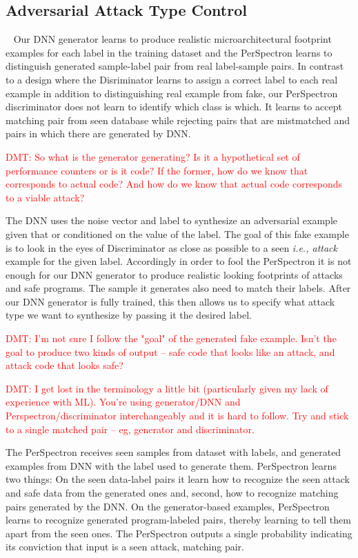 \subsection{Adversarial Attack Type Control}~\label{TypeControl}
 Our DNN generator learns to produce realistic microarchitectural footprint examples for each label in the training dataset and the PerSpectron learns to distinguish generated sample-label pair from real label-sample pairs.   
 In contrast to a design where the Disriminator learns to assign a correct label to each real example in addition to distinguishing real example from fake, our PerSpectron discriminator does not learn to identify which class is which.  It learns to accept matching pair from seen database while rejecting pairs that are mistmatched and pairs in which there are generated by DNN. 
 
 \textcolor{red}{DMT: So what is the generator generating?  Is it a hypothetical set of performance
 counters or is it code?  If the former, how do we know that corresponds to actual code?  And how do we know that actual code 
 corresponds to a viable attack?}
 
 The DNN uses the noise vector and label to synthesize an adversarial example given that or conditioned on the value of the label. The goal of this fake example is to look in the eyes of Discriminator as close as possible to a seen {\em i.e., attack} example for the given label.  
 Accordingly in order to fool the PerSpectron it is not enough for our DNN generator to produce realistic looking footprints of attacks and safe programs. The sample it generates also need to match their labels. After our DNN generator is fully trained, this then allows us to specify what attack type we want to synthesize by passing it the desired label. 

 \textcolor{red}{DMT:  I'm not sure I follow the "goal" of the generated fake example.  Isn't the goal
 to produce two kinds of output -- safe code that looks like an attack, and attack code that looks safe?}
 
 \textcolor{red}{DMT: I get lost in the terminology a little bit (particularly given my lack of 
 experience with ML).  You're using generator/DNN and Perspectron/discriminator interchangeably and it
 is hard to follow.  Try and stick to a single matched pair -- eg, generator and discriminator.}
 
 The PerSpectron receives seen samples from dataset  with labels, and generated examples from DNN with the label used to generate them.  PerSpectron learns two things: 
 On the seen data-label pairs it learn
 how to recognize the seen attack and safe data from the generated ones and, second, how to recognize matching pairs generated by the DNN. On the generator-based examples, PerSpectron learns to recognize generated program-labeled pairs, thereby learning to tell them apart from the seen ones. The PerSpectron outputs a single probability indicating its conviction that input is a seen attack, matching pair. 
 
